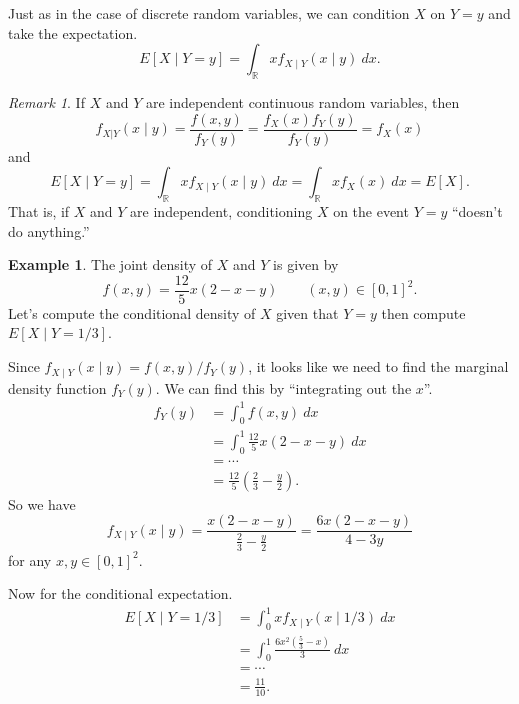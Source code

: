 \documentclass[12pt]{article}
\theoremstyle{plain}
\theoremstyle{definition}
\newtheorem{example}[theorem]{Example}
\theoremstyle{remark}
\newtheorem{remark}[theorem]{Remark}
\newcommand{\R}{\mathbb{R}}
\begin{document}
Just as in the case of discrete random variables, we can condition $X$ on $Y=y$ and take the expectation.
\[
    E[X\mid Y=y] = \int_\R xf_{X\mid Y}(x\mid y)\ dx.
\]

\begin{remark}
    If $X$ and $Y$ are independent continuous random variables, then
    \[
        f_{X|Y}(x\mid y) = \frac{f(x,y)}{f_Y(y)} = \frac{f_X(x)f_Y(y)}{f_Y(y)} = f_X(x)
    \]
    and
    \[
        E[X\mid Y=y] = \int_\R x f_{X\mid Y}(x\mid y)\ dx = \int_\R x f_X(x)\ dx = E[X].
    \]
    That is, if $X$ and $Y$ are independent, conditioning $X$ on the event $Y=y$ ``doesn't do anything.''
\end{remark}

\begin{example}
    The joint density of $X$ and $Y$ is given by
    \[
        f(x,y) = \frac{12}{5}x(2-x-y)\qquad (x,y)\in [0,1]^2.
    \]
    Let's compute the conditional density of $X$ given that $Y=y$ then compute $E[X\mid Y=1/3]$.

    Since $f_{X\mid Y}(x\mid y) = f(x,y)/f_Y(y)$, it looks like we need to find the marginal density function $f_Y(y)$.
    We can find this by ``integrating out the $x$''.
    \begin{align*}
        f_Y(y) &= \int_0^1 f(x,y)\ dx\\
        &= \int_0^1 \frac{12}{5} x(2-x-y)\ dx\\
        &= \cdots\\
        &= \frac{12}{5}\left(\frac{2}{3} - \frac{y}{2}\right).
    \end{align*}
    So we have 
    \[
        f_{X\mid Y}(x\mid y) = \frac{x (2-x-y)}{\frac{2}{3} - \frac{y}{2}} = \frac{6x(2-x-y)}{4-3y}
    \]
    for any $x, y\in [0,1]^2$.

    Now for the conditional expectation.
    \begin{align*}
        E[X\mid Y=1/3] &= \int_0^1 xf_{X\mid Y}(x\mid 1/3)\ dx\\
        &= \int_0^1 \frac{6x^2(\frac{5}{3}-x)}{3}\ dx\\
        &= \cdots\\
        &= \frac{11}{10}.
    \end{align*}
\end{example}
\end{document}
